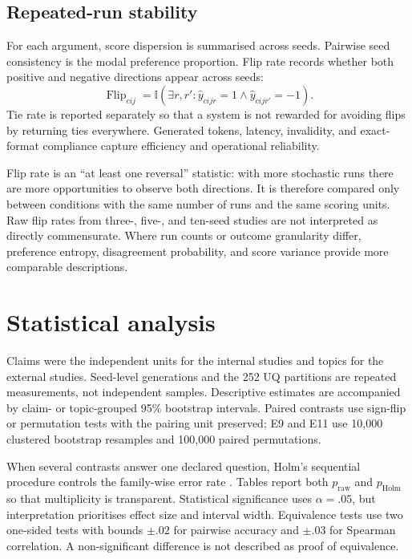 \documentclass[11pt,twoside,a4paper]{report}
\newcommand{\rawp}{\ensuremath{p_{\mathrm{raw}}}}
\newcommand{\holmp}{\ensuremath{p_{\mathrm{Holm}}}}
\newcommand{\ind}{\mathbb{I}}
\begin{document}
\subsection{Repeated-run stability}

For each argument, score dispersion is summarised across seeds.  Pairwise seed
consistency is the modal preference proportion.  Flip rate records whether both
positive and negative directions appear across seeds:
\begin{equation}
 \operatorname{Flip}_{cij}=\ind\left(\exists r,r':
 \widehat y_{cijr}=1\land\widehat y_{cijr'}=-1\right).
\end{equation}
Tie rate is reported separately so that a system is not rewarded for avoiding flips
by returning ties everywhere.  Generated tokens, latency, invalidity, and exact-format
compliance capture efficiency and operational reliability.

Flip rate is an ``at least one reversal'' statistic: with more stochastic runs there
are more opportunities to observe both directions.  It is therefore compared only
between conditions with the same number of runs and the same scoring units.  Raw
flip rates from three-, five-, and ten-seed studies are not interpreted as directly
commensurate.  Where run counts or outcome granularity differ, preference entropy,
disagreement probability, and score variance provide more comparable descriptions.

\section{Statistical analysis}
\label{sec:statistics}

Claims were the independent units for the internal studies and topics for the
external studies.  Seed-level generations and the 252 UQ partitions are repeated
measurements, not independent samples.  Descriptive estimates are accompanied by
claim- or topic-grouped 95\% bootstrap intervals.  Paired contrasts use sign-flip or
permutation tests with the pairing unit preserved; E9 and E11 use 10,000 clustered
bootstrap resamples and 100,000 paired permutations.

When several contrasts answer one declared question, Holm's sequential procedure
controls the family-wise error rate \cite{holm1979simple}.  Tables report both
\rawp{} and \holmp{} so that multiplicity is transparent.  Statistical significance
uses $\alpha=.05$, but interpretation prioritises effect size and interval width.
Equivalence tests use two one-sided tests with bounds $\pm.02$ for pairwise accuracy
and $\pm.03$ for Spearman correlation.  A non-significant difference is not described
as proof of equivalence.
\end{document}

